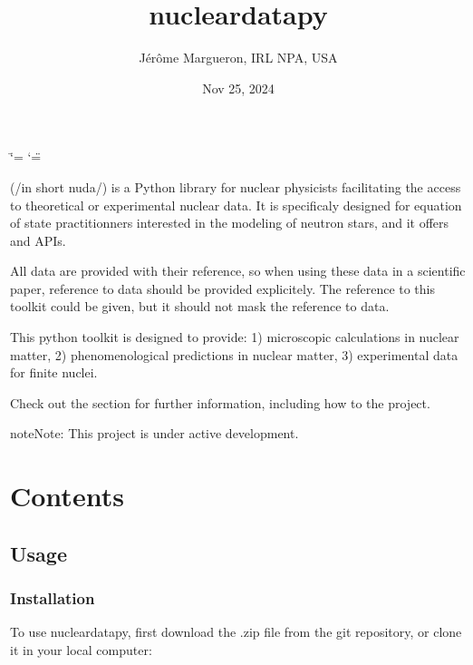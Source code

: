 \documentclass[letterpaper,10pt,english]{sphinxmanual}
\title{nucleardatapy}
\date{Nov 25, 2024}
\author{Jérôme Margueron, IRL NPA, USA}
\begin{document}
\ifdefined\shorthandoff
  \ifnum\catcode`\=\string=\active\shorthandoff{=}\fi
  \ifnum\catcode`\"=\active{}\fi
\fi

\pagestyle{empty}
\sphinxmaketitle
\pagestyle{plain}
\sphinxtableofcontents
\pagestyle{normal}
\label{\detokenize{index::doc}}


\sphinxAtStartPar
{} (/in short nuda/) is a Python library for nuclear physicists facilitating the access to theoretical or experimental nuclear data. It is specificaly designed for equation of state practitionners interested in the modeling of neutron stars, and it offers  and  APIs.

\sphinxAtStartPar
All data are provided with their reference, so when using these data in a scientific paper, reference to data should be provided explicitely. The reference to this toolkit could be given, but it should not mask the reference to data.

\sphinxAtStartPar
This python toolkit is designed to provide:
1) microscopic calculations in nuclear matter,
2) phenomenological predictions in nuclear matter,
3) experimental data for finite nuclei.

\sphinxAtStartPar
Check out the {\hyperref[\detokenize{source/usage::doc}]{}} section for further information, including how to
{\hyperref[\detokenize{source/usage:installation}]{}} the project.

\begin{sphinxadmonition}{note}{Note:}
\sphinxAtStartPar
This project is under active development.
\end{sphinxadmonition}


\chapter{Contents}
\label{\detokenize{index:contents}}
\sphinxstepscope


\section{Usage}
\label{\detokenize{source/usage:usage}}\label{\detokenize{source/usage::doc}}

\subsection{Installation}
\label{\detokenize{source/usage:installation}}\label{\detokenize{source/usage:id1}}
\sphinxAtStartPar
To use nucleardatapy, first download the .zip file from the git repository, or clone it in your local computer:
\end{document}
